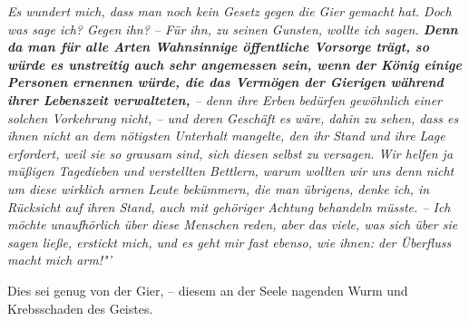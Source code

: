 \medskip

\textit{Es wundert mich, dass man noch kein Gesetz gegen die
Gier gemacht hat. Doch was
sage ich? Gegen ihn? – Für ihn, zu seinen Gunsten, wollte ich sagen.
\label{ref:13_22_wahnsinnige}\textbf{Denn da man
für alle Arten Wahnsinnige öffentliche Vorsorge trägt, so würde es unstreitig
auch sehr angemessen sein, wenn der König einige Personen ernennen würde, die das
Vermögen der Gierigen während ihrer Lebenszeit verwalteten,} -- denn ihre Erben
bedürfen gewöhnlich einer solchen Vorkehrung nicht, -- und deren Geschäft es
wäre, dahin zu sehen, dass es ihnen nicht an dem nötigsten Unterhalt mangelte,
den ihr Stand und ihre Lage erfordert, weil sie so grausam sind, sich diesen
selbst zu versagen. Wir helfen ja müßigen Tagedieben und verstellten
Bettlern,
warum wollten wir uns denn nicht um diese wirklich armen Leute bekümmern, die
man übrigens, denke ich, in Rücksicht auf ihren Stand, auch mit gehöriger
Achtung behandeln müsste. -- Ich möchte unaufhörlich über diese Menschen reden,
aber das viele, was sich über sie sagen ließe, erstickt mich, und es geht mir
fast ebenso, wie ihnen: der Überfluss macht mich arm!"'}

\medskip

Dies sei genug von der Gier, -- diesem an der Seele nagenden Wurm und
Krebsschaden des Geistes.



